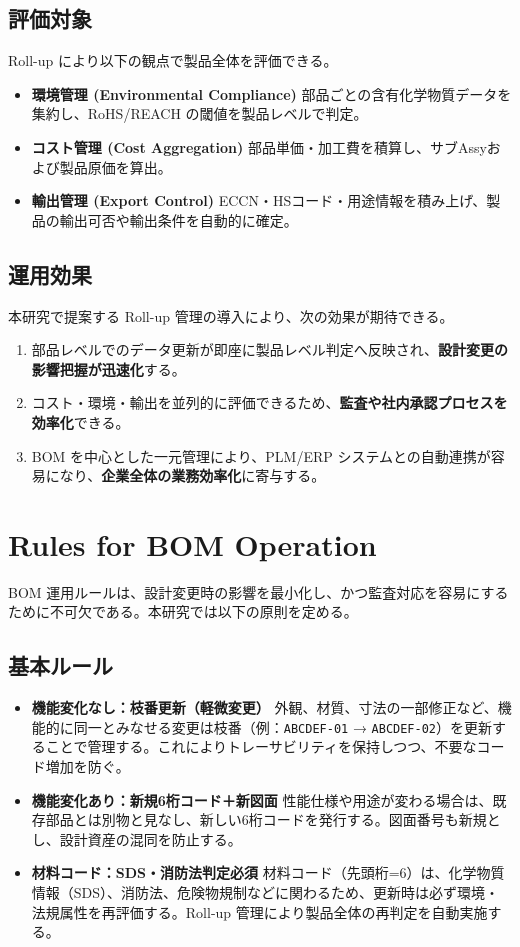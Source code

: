 \documentclass[10pt,conference]{IEEEtran}
\begin{document}
\subsection{評価対象}
Roll-up により以下の観点で製品全体を評価できる。
\begin{itemize}
  \item \textbf{環境管理 (Environmental Compliance)}  
  部品ごとの含有化学物質データを集約し、RoHS/REACH の閾値を製品レベルで判定。
  \item \textbf{コスト管理 (Cost Aggregation)}  
  部品単価・加工費を積算し、サブAssyおよび製品原価を算出。
  \item \textbf{輸出管理 (Export Control)}  
  ECCN・HSコード・用途情報を積み上げ、製品の輸出可否や輸出条件を自動的に確定。
\end{itemize}

\subsection{運用効果}
本研究で提案する Roll-up 管理の導入により、次の効果が期待できる。
\begin{enumerate}
  \item 部品レベルでのデータ更新が即座に製品レベル判定へ反映され、\textbf{設計変更の影響把握が迅速化}する。
  \item コスト・環境・輸出を並列的に評価できるため、\textbf{監査や社内承認プロセスを効率化}できる。
  \item BOM を中心とした一元管理により、PLM/ERP システムとの自動連携が容易になり、\textbf{企業全体の業務効率化}に寄与する。
\end{enumerate}

\section{Rules for BOM Operation}
BOM 運用ルールは、設計変更時の影響を最小化し、かつ監査対応を容易にするために不可欠である。本研究では以下の原則を定める。

\subsection{基本ルール}
\begin{itemize}
  \item \textbf{機能変化なし：枝番更新（軽微変更）}  
  外観、材質、寸法の一部修正など、機能的に同一とみなせる変更は枝番（例：\texttt{ABCDEF-01} → \texttt{ABCDEF-02}）を更新することで管理する。これによりトレーサビリティを保持しつつ、不要なコード増加を防ぐ。
  \item \textbf{機能変化あり：新規6桁コード＋新図面}  
  性能仕様や用途が変わる場合は、既存部品とは別物と見なし、新しい6桁コードを発行する。図面番号も新規とし、設計資産の混同を防止する。
  \item \textbf{材料コード：SDS・消防法判定必須}  
  材料コード（先頭桁=6）は、化学物質情報（SDS）、消防法、危険物規制などに関わるため、更新時は必ず環境・法規属性を再評価する。Roll-up 管理により製品全体の再判定を自動実施する。
\end{itemize}
\end{document}
